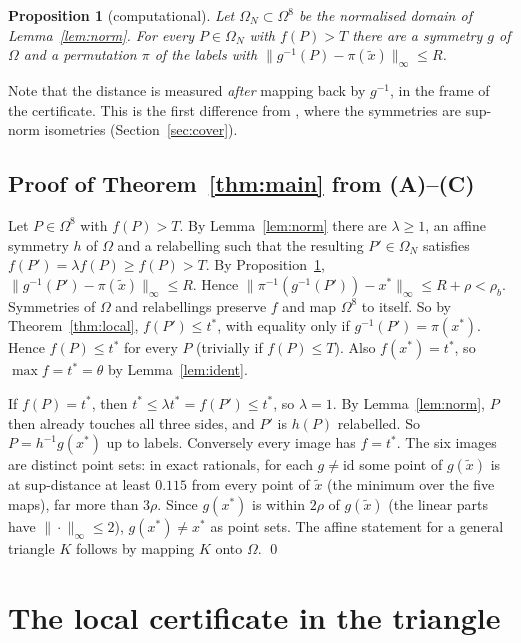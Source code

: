\documentclass[11pt]{amsart}
\newtheorem{proposition}[theorem]{Proposition}
\theoremstyle{definition}
\newcommand{\tstar}{t^{*}}
\newcommand{\Om}{\Omega}
\begin{document}
\begin{proposition}[computational]\label{prop:bb}
Let $\Om_N \subset \Om^8$ be the normalised domain of Lemma~\ref{lem:norm}. For every $P \in \Om_N$ with $f(P) > T$ there are a symmetry $g$ of $\Om$ and a permutation $\pi$ of the labels with $\|g^{-1}(P) - \pi(\tilde x)\|_\infty \le R$.
\end{proposition}
Note that the distance is measured \emph{after} mapping back by $g^{-1}$, in the frame of the certificate. This is the first difference from \cite{N9}, where the symmetries are sup-norm isometries (Section~\ref{sec:cover}).

\subsection{Proof of Theorem~\ref{thm:main} from (A)--(C)}
Let $P \in \Om^8$ with $f(P) > T$. By Lemma~\ref{lem:norm} there are $\lambda \ge 1$, an affine symmetry $h$ of $\Om$ and a relabelling such that the resulting $P' \in \Om_N$ satisfies $f(P') = \lambda f(P) \ge f(P) > T$. By Proposition~\ref{prop:bb}, $\|g^{-1}(P') - \pi(\tilde x)\|_\infty \le R$. Hence $\|\pi^{-1}(g^{-1}(P')) - x^*\|_\infty \le R + \rho < \rho_b$. Symmetries of $\Om$ and relabellings preserve $f$ and map $\Om^8$ to itself. So by Theorem~\ref{thm:local}, $f(P') \le \tstar$, with equality only if $g^{-1}(P') = \pi(x^*)$. Hence $f(P) \le \tstar$ for every $P$ (trivially if $f(P) \le T$). Also $f(x^*) = \tstar$, so $\max f = \tstar = \theta$ by Lemma~\ref{lem:ident}.

If $f(P) = \tstar$, then $\tstar \le \lambda\tstar = f(P') \le \tstar$, so $\lambda = 1$. By Lemma~\ref{lem:norm}, $P$ then already touches all three sides, and $P'$ is $h(P)$ relabelled. So $P = h^{-1}g(x^*)$ up to labels. Conversely every image has $f = \tstar$. The six images are distinct point sets: in exact rationals, for each $g \ne \mathrm{id}$ some point of $g(\tilde x)$ is at sup-distance at least $0.115$ from every point of $\tilde x$ (the minimum over the five maps), far more than $3\rho$. Since $g(x^*)$ is within $2\rho$ of $g(\tilde x)$ (the linear parts have $\|\cdot\|_\infty \le 2$), $g(x^*) \ne x^*$ as point sets. The affine statement for a general triangle $K$ follows by mapping $K$ onto $\Om$. \qed

\section{The local certificate in the triangle}\label{sec:local}
\end{document}
